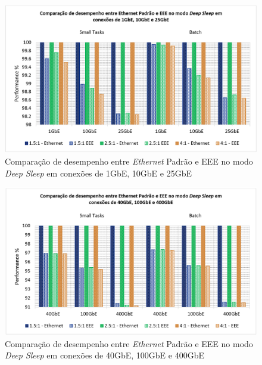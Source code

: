\begin{figure}[htp]
    \centering
    \includegraphics[width=16cm]{4-EEEHadoop/Image3_EEEPerformance1-10-25.PNG}
    \caption{\centering Comparação de desempenho entre \emph{Ethernet} Padrão e EEE no modo \emph{Deep Sleep} em conexões de 1GbE, 10GbE e 25GbE}
    \label{fig:EEEPerformance1-10-25}
\end{figure}

\begin{figure}[htp]
    \centering
    \includegraphics[width=16cm]{4-EEEHadoop/Image4_EEEPerformance40-100-400.PNG}
    \caption{\centering Comparação de desempenho entre \emph{Ethernet} Padrão e EEE no modo \emph{Deep Sleep} em conexões de 40GbE, 100GbE e 400GbE}
    \label{fig:EEEPerformance40-100-400}
\end{figure}

